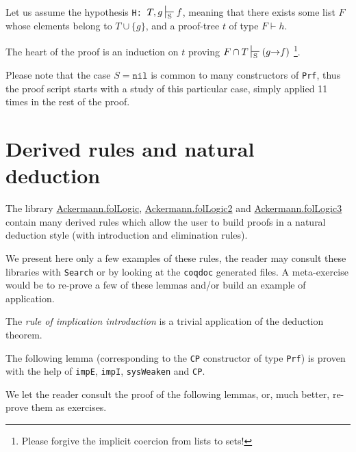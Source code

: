 Let us assume the hypothesis \texttt{H: $T, g \sdash f$},
meaning that there exists some list $F$ whose elements 
belong to $T \cup \{g\}$, and a proof-tree $t$ of type
$F \vdash h$.

The heart of the proof is an induction on $t$ proving 
$F \cap T \sdash (g\arrow f)$ \footnote{Please forgive the implicit coercion from lists to sets!}. 

Please note that the case $S=\texttt{nil}$ is common to 
many constructors of \texttt{Prf}, thus the proof script starts
with a study of this particular case, simply applied 11 times in the rest of the proof. 

 
\section{Derived rules and natural deduction}


 The library 
 \href{../theories/html/hydras.Ackermann.folLogic.html}{Ackermann.folLogic},
\href{../theories/html/hydras.Ackermann.folLogic.html}{Ackermann.folLogic2} and
\href{../theories/html/hydras.Ackermann.folLogic.html}{Ackermann.folLogic3} contain many derived rules which allow the user to build proofs in a natural deduction style (with introduction and elimination rules).

We present here only a few examples of these rules, the reader
may consult these libraries with \texttt{Search} or by looking 
at the \texttt{coqdoc} generated files. A meta-exercise would be to re-prove a few of these lemmas and/or build an example of application.


The \emph{rule of implication introduction} is a trivial application of the deduction theorem.


The following lemma (corresponding to the \texttt{CP} constructor of type \texttt{Prf}) is proven with the help of \texttt{impE}, \texttt{impI}, 
\texttt{sysWeaken} and \texttt{CP}.  


We let the reader consult the proof of the following lemmas, or, much better, re-prove them as exercises.


